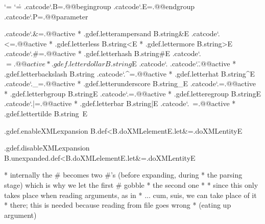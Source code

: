 \newtoks\XMLtoks
\newtoks\XMLresetlist

\newif\ifignoreXMLspaces
\newif\iffixedXMLfont
\newif\iftraceXMLelements

\newcount\XMLlevel %
\newcount\XMLdepth %

\newtoks\everyenableXML



\chardef\XMLtokensreduction\zerocount


\bgroup
\catcode`\*=\@@comment
\catcode`\.=\@@escape
.catcode`.B=.@@begingroup
.catcode`.E=.@@endgroup
.catcode`.P=.@@parameter

.catcode`.&=.@@active * .gdef.letterampersand  B.string&E
.catcode`.<=.@@active * .gdef.letterless       B.string<E
                      * .gdef.lettermore       B.string>E
.catcode`.#=.@@active * .gdef.letterhash       B.string#E
.catcode`.$=.@@active * .gdef.letterdollar     B.string$E
.catcode`.%
.catcode`.\=.@@active * .gdef.letterbackslash  B.string\E
.catcode`.^=.@@active * .gdef.letterhat        B.string^E
.catcode`._=.@@active * .gdef.letterunderscore B.string_E
.catcode`.{=.@@active * .gdef.letterbgroup     B.string{E
.catcode`.}=.@@active * .gdef.letteregroup     B.string}E
.catcode`.|=.@@active * .gdef.letterbar        B.string|E
.catcode`.~=.@@active * .gdef.lettertilde      B.string~E

.gdef.enableXMLexpansion
  B.def<B.doXMLelementE.let&=.doXMLentityE

.gdef.disableXMLexpansion
  B.unexpanded.def<B.doXMLelementE.let&=.doXMLentityE

* internally the # becomes two #'s (before expanding, during
* the parsing stage) which is why we let the first # gobble
* the second one
*
* since this only takes place when reading arguments, as in
* \startXMLdata ... cum, suis, we can take place of it
* there; this is needed because reading from file goes wrong
* (eating up argument)

